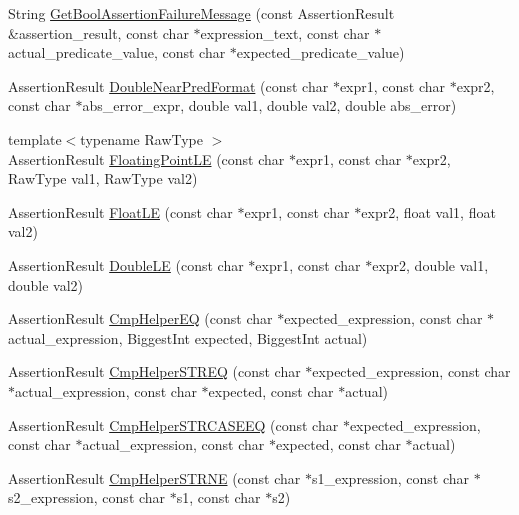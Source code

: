 \begin{DoxyCompactItemize}
\item 
\-String \hyperlink{namespacetesting_1_1internal_ab5e2ffddf04d86a4faa0253b8e1fe67e}{\-Get\-Bool\-Assertion\-Failure\-Message} (const \-Assertion\-Result \&assertion\-\_\-result, const char $\ast$expression\-\_\-text, const char $\ast$actual\-\_\-predicate\-\_\-value, const char $\ast$expected\-\_\-predicate\-\_\-value)
\item 
\-Assertion\-Result \hyperlink{namespacetesting_1_1internal_a44c08eb9054d3bf89ac3e7ac0549929f}{\-Double\-Near\-Pred\-Format} (const char $\ast$expr1, const char $\ast$expr2, const char $\ast$abs\-\_\-error\-\_\-expr, double val1, double val2, double abs\-\_\-error)
\item 
{\footnotesize template$<$typename Raw\-Type $>$ }\\\-Assertion\-Result \hyperlink{namespacetesting_1_1internal_a27094d26e2f0cf4bcf02d6b8e3382f70}{\-Floating\-Point\-L\-E} (const char $\ast$expr1, const char $\ast$expr2, \-Raw\-Type val1, \-Raw\-Type val2)
\item 
\-Assertion\-Result \hyperlink{namespacetesting_a23a2d15c37bf756a5baf67922ad35172}{\-Float\-L\-E} (const char $\ast$expr1, const char $\ast$expr2, float val1, float val2)
\item 
\-Assertion\-Result \hyperlink{namespacetesting_aa02480b781912f18f8b22ab91a905d58}{\-Double\-L\-E} (const char $\ast$expr1, const char $\ast$expr2, double val1, double val2)
\item 
\-Assertion\-Result \hyperlink{namespacetesting_1_1internal_ab3ac33c050b73adde43e78111448805f}{\-Cmp\-Helper\-E\-Q} (const char $\ast$expected\-\_\-expression, const char $\ast$actual\-\_\-expression, \-Biggest\-Int expected, \-Biggest\-Int actual)
\item 
\-Assertion\-Result \hyperlink{namespacetesting_1_1internal_aac3ea8412a9d5f786b992a2b06aeb353}{\-Cmp\-Helper\-S\-T\-R\-E\-Q} (const char $\ast$expected\-\_\-expression, const char $\ast$actual\-\_\-expression, const char $\ast$expected, const char $\ast$actual)
\item 
\-Assertion\-Result \hyperlink{namespacetesting_1_1internal_aa5c3543f39545113a66c5b4d8f829fc6}{\-Cmp\-Helper\-S\-T\-R\-C\-A\-S\-E\-E\-Q} (const char $\ast$expected\-\_\-expression, const char $\ast$actual\-\_\-expression, const char $\ast$expected, const char $\ast$actual)
\item 
\-Assertion\-Result \hyperlink{namespacetesting_1_1internal_a24dfe04b51cda2637868440f0e6a7110}{\-Cmp\-Helper\-S\-T\-R\-N\-E} (const char $\ast$s1\-\_\-expression, const char $\ast$s2\-\_\-expression, const char $\ast$s1, const char $\ast$s2)

\end{DoxyCompactItemize}
